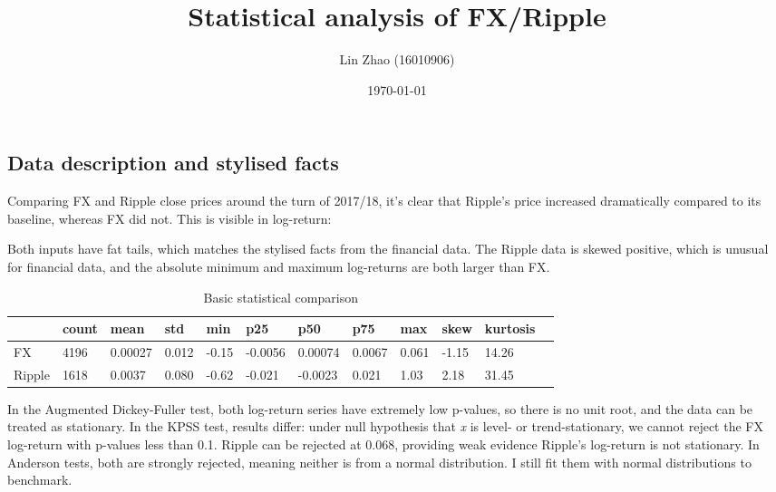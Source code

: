 \documentclass{article}
\newcommand{\ciapdf}[1]{\resizebox{\textwidth}{!}{\texttt{[image: \#1]}}}
\begin{document}
\title{Statistical analysis of FX/Ripple}
\author{Lin Zhao (16010906)}
\date{\today}
\maketitle

\subsection*{Data description and stylised facts}

Comparing FX and Ripple close prices around the turn of 2017/18, it's clear
that Ripple's price increased dramatically compared to its baseline, whereas FX
did not. This is visible in log-return:

\ciapdf{assignment_1/report_pic/FXPrice.pdf}
\ciapdf{assignment_1/report_pic/RippleClosePrice.pdf}
\ciapdf{assignment_1/report_pic/FinancialLogReturn.pdf}
\ciapdf{assignment_1/report_pic/RippleLogReturn.pdf}

Both inputs have fat tails, which matches the stylised facts from the financial
data. The Ripple data is skewed positive, which is unusual for financial data,
and the absolute minimum and maximum log-returns are both larger than FX.

\begin{table}[H]
    \caption{Basic statistical comparison}
    \begin{tabular}{|l|l|l|l|l|l|l|l|l|l|l|l|}
    \hline
           & count & mean    & std   & min   & p25     & p50     & p75    & max   & skew  & kurtosis \\ \hline
    FX     & 4196  & 0.00027 & 0.012 & -0.15 & -0.0056 & 0.00074 & 0.0067 & 0.061 & -1.15 & 14.26    \\ \hline
    Ripple & 1618  & 0.0037  & 0.080 & -0.62 & -0.021  & -0.0023 & 0.021  & 1.03  & 2.18  & 31.45    \\ \hline
    \end{tabular}
\end{table}

In the Augmented Dickey-Fuller test, both log-return series have extremely low
p-values, so there is no unit root, and the data can be treated as stationary.
In the KPSS test, results differ: under null hypothesis that \emph{x}
is level- or trend-stationary, we cannot reject the FX log-return with
p-values less than 0.1. Ripple can be rejected at 0.068, providing
weak evidence Ripple's log-return is not stationary. In Anderson tests,
both are strongly rejected, meaning neither is from a normal distribution. I
still fit them with normal distributions to benchmark.
\end{document}

